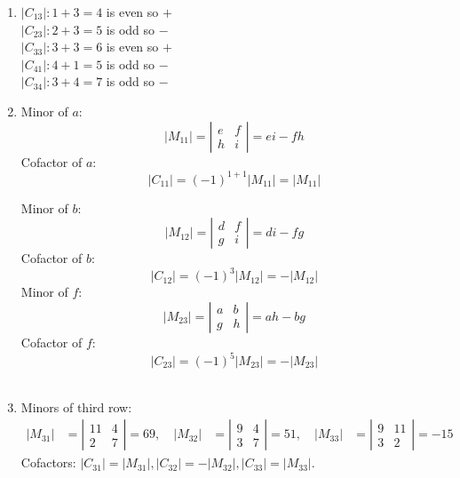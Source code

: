 \begin{enumerate}
  \item \( \left|C_{13}\right|: 1+3=4 \) is even so \( + \)\\
\( \left|C_{23}\right|: 2+3=5 \) is odd so \(- \)\\
\( \left|C_{33}\right|: 3+3=6 \) is even so \( + \)\\
\( \left|C_{41}\right|: 4+1=5 \) is odd so \( - \)\\
\( \left|C_{34}\right|: 3+4=7 \) is odd so \( - \) \\


\item 
Minor of \(a\):
\[ \left|M_{11}\right|=\left|\begin{array}{cc}e & f \\ h & i\end{array}\right|=e i-f h \]
Cofactor of \(a\): \[
\left|C_{11}\right|=(-1)^{1+1}\left|M_{11}\right|=\left|M_{11}\right|
\]

Minor of \(b\):
\[ \left|M_{12}\right|=\left|\begin{array}{ll}d & f \\ g & i\end{array}\right|=d i-f g \]
Cofactor of \(b\):
\[\left|C_{12}\right|=(-1)^{3}\left|M_{12}\right|=-\left|M_{12}\right| \]
Minor of \(f\):
\[ \left|M_{23}\right|=\left|\begin{array}{ll}a & b \\ g & h\end{array}\right|=a h-b g \]
Cofactor of \(f\):
\[\left|C_{23}\right|=(-1)^{5}\left|M_{23}\right|=-\left|M_{23}\right| \] \\

\item[6.] Minors of third row:
\[
\begin{aligned}
\left|M_{31}\right| &=\left|\begin{array}{cc}
11 & 4 \\
2 & 7
\end{array}\right| = 69, \quad
\left|M_{32}\right|&=\left|\begin{array}{cc}
9 & 4 \\
3 & 7
\end{array}\right| = 51, \quad
 \left|M_{33}\right|&=\left|\begin{array}{ll}
9 & 11 \\
3 & 2
\end{array}\right| =-15
\end{aligned}
\]
Cofactors: $ |C_{31}| =  |M_{31}|, |C_{32}| =  -|M_{32}| , |C_{33}| =  |M_{33}| $.\end{enumerate}

